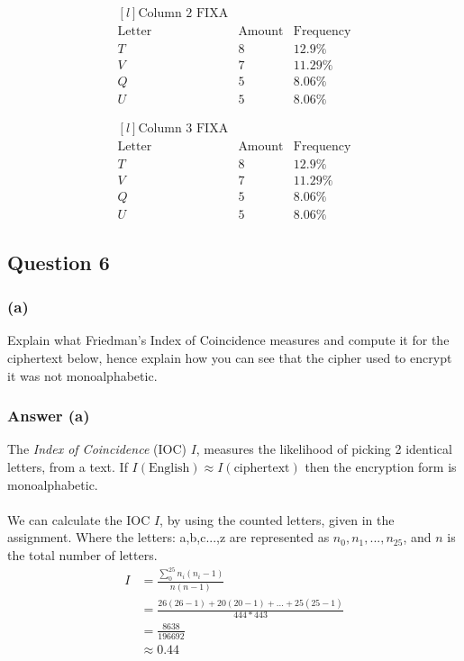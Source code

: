 \documentclass{article}
\begin{document}
	\[
	\begin{matrix*}[l]
	\text{Column 2 FIXA} \\
	\text{Letter} & \text{Amount} & \text{Frequency} \\
	T & 8&12.9\% \\
	V & 7&11.29\% \\
	Q & 5&8.06\% \\
	U & 5&8.06\% 
	\end{matrix*}
	\]
	
	\[
	\begin{matrix*}[l]
	\text{Column 3 FIXA} \\
	\text{Letter} & \text{Amount} & \text{Frequency} \\
	T & 8&12.9\% \\
	V & 7&11.29\% \\
	Q & 5&8.06\% \\
	U & 5&8.06\% 
	\end{matrix*}
	\]
	
	
	
	\subsection*{Question 6}
	\subsubsection*{(a)}
	Explain what Friedman’s Index of Coincidence measures and compute it for the
	ciphertext below, hence explain how you can see that the cipher used to encrypt it was not monoalphabetic.
	
	\subsubsection*{Answer (a)}
	The \textit{Index of Coincidence} (IOC) $I$, measures the likelihood of picking 2 identical letters, from a text. If $I(\text{English}) \approx I(\text{ciphertext})$ then the encryption form is monoalphabetic.
	\\\\
	We can calculate the IOC $I$, by using the counted letters, given in the assignment. Where the  letters: a,b,c...,z are represented as $n_0,n_1,...,n_{25}$, and $n$ is the total number of letters. 
	\[
	\begin{split}
	I &= \frac{\sum_{0}^{25}n_i(n_i-1)}{n(n-1)} \\
	&=\frac{26(26-1)+20(20-1)+...+25(25-1)}{444*443} \\
	&=\frac{8638}{196692} \\
	&\approx0.44
	\end{split}
	\]
	
\end{document}
